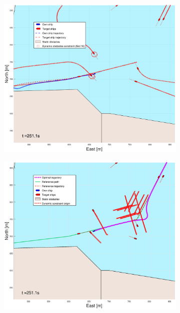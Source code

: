 \begin{figure}[ht]
\begin{subfigure}[b]{0.499\textwidth}
    \end{subfigure}
    \hfill
    \\
    \begin{subfigure}[b]{0.49\textwidth}
        \centering
        \includegraphics[width=\textwidth]{Images/Figures/Trheimfjord/_Simple_0fig1_time=251}
    \end{subfigure}
    \hfill
    \begin{subfigure}[b]{0.499\textwidth}
        \centering
        \includegraphics[width=\textwidth]{Images/Figures/Trheimfjord/_Simple_0fig999_time=251}

\end{subfigure}
\end{figure}
